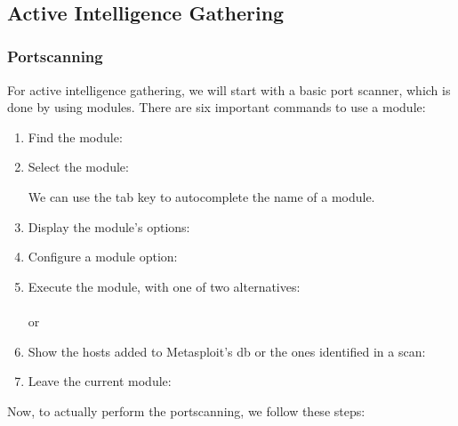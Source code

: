  \\

\subsection{Active Intelligence Gathering}

\subsubsection{Portscanning}
For active intelligence gathering, we will start with a basic port scanner, which is done by using modules. There are six important commands to use a module:

\begin{enumerate}
    \item Find the module: \\
    \item Select the module: \\
    \begin{tipbox}[innermargin=-25pt]
        We can use the tab key to autocomplete the name of a module.
    \end{tipbox}    
    \item Display the module's options: \\
    \item Configure a module option:\\
    \item Execute the module, with one of two alternatives: \\
     \\ or \\ 
    \item Show the hosts added to Metasploit's db or the ones identified in a scan: \\
    \item Leave the current module: \\
\end{enumerate}

Now, to actually perform the portscanning, we follow these steps:

